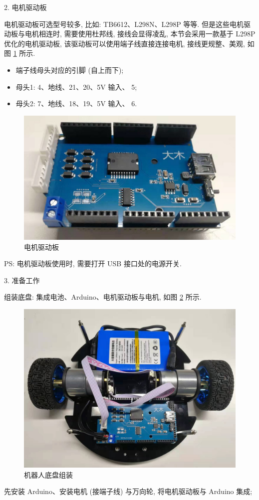 \documentclass[openany, fontset=windowsold]{ctexbook}
\theoremstyle{kaiti}
\theoremstyle{normal}
\begin{document}
2. 电机驱动板

电机驱动板可选型号较多, 比如: TB6612、L298N、L298P 等等. 但是这些电机驱动板与电机相连时, 需要使用杜邦线, 接线会显得凌乱, 本节会采用一款基于 L298P 优化的电机驱动板, 该驱动板可以使用端子线直接连接电机, 接线更规整、美观, 如图 \ref{fig:motor_drive_board} 所示.

\begin{itemize}
  \item 端子线母头对应的引脚 (自上而下);
  \item 母头1: 4、地线、21、20、5V 输入、 5;
  \item 母头2: 7、地线、18、19、5V 输入、 6.
\end{itemize}

\begin{figure}[!ht]
  \centering
  \includegraphics[width=.5\textwidth]{motor_drive_board.jpg}
  \caption{电机驱动板}
  \label{fig:motor_drive_board}
\end{figure}

PS: 电机驱动板使用时, 需要打开 USB 接口处的电源开关.

3. 准备工作

组装底盘: 集成电池、Arduino、电机驱动板与电机, 如图 \ref{fig:robot_chassis_front__} 所示.

\begin{figure}[!ht]
  \centering
  \includegraphics[width=.5\textwidth]{robot_chassis_front.jpg}
  \caption{机器人底盘组装}
  \label{fig:robot_chassis_front__}
\end{figure}

先安装 Arduino、安装电机 (接端子线) 与万向轮, 将电机驱动板与 Arduino 集成; 
\end{document}
